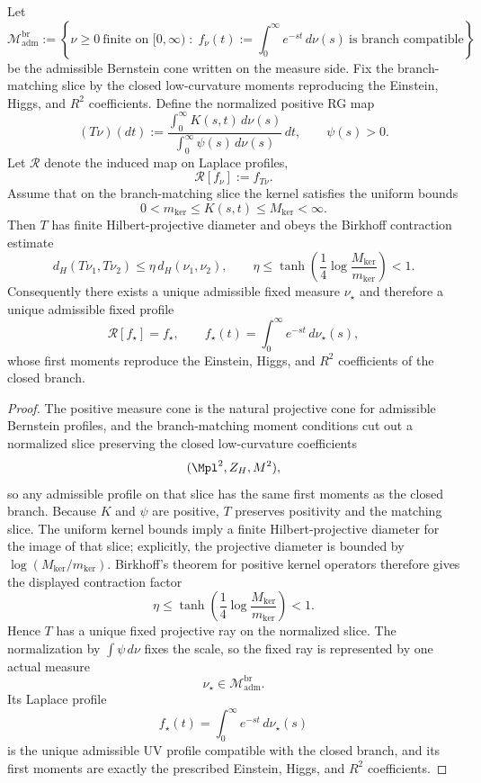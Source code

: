 \begin{theorem}
\label{thm:geometric-uv-fixed-point}
Let
\[
\mathcal M_{\mathrm{adm}}^{\mathrm{br}}
:=
\left\{
\nu\ge 0\ \text{finite on }[0,\infty)\;:\;
f_\nu(t):=\int_0^\infty e^{-st}\,d\nu(s)\ \text{is branch compatible}
\right\}
\]
be the admissible Bernstein cone written on the measure side. Fix the branch-matching slice by the
closed low-curvature moments reproducing the Einstein, Higgs, and $R^2$ coefficients. Define the
normalized positive RG map
\[
(T\nu)(dt)
:=
\frac{\int_0^\infty K(s,t)\,d\nu(s)}{\int_0^\infty \psi(s)\,d\nu(s)}\,dt,
\qquad
\psi(s)>0.
\]
Let $\mathcal R$ denote the induced map on Laplace profiles,
\[
\mathcal R[f_\nu]:=f_{T\nu}.
\]
Assume that on the branch-matching slice the kernel satisfies the uniform bounds
\[
0<m_{\mathrm{ker}}\le K(s,t)\le M_{\mathrm{ker}}<\infty.
\]
Then $T$ has finite Hilbert-projective diameter and obeys the Birkhoff contraction estimate
\[
d_H(T\nu_1,T\nu_2)
\le
\eta\,d_H(\nu_1,\nu_2),
\qquad
\eta\le
\tanh\!\left(\frac14\log\frac{M_{\mathrm{ker}}}{m_{\mathrm{ker}}}\right)<1.
\]
Consequently there exists a unique admissible fixed measure $\nu_\star$ and therefore a unique
admissible fixed profile
\[
\mathcal R[f_\star]=f_\star,
\qquad
f_\star(t)=\int_0^\infty e^{-st}\,d\nu_\star(s),
\]
whose first moments reproduce the Einstein, Higgs, and $R^2$ coefficients of the closed branch.
\end{theorem}

\begin{proof}
The positive measure cone is the natural projective cone for admissible Bernstein profiles, and the
branch-matching moment conditions cut out a normalized slice preserving the closed low-curvature
coefficients
\[
(\Mpl^2,Z_H,M^2),
\]
so any admissible profile on that slice has the same first moments as the closed branch. Because
$K$ and $\psi$ are positive, $T$ preserves positivity and the matching slice. The uniform kernel
bounds imply a finite Hilbert-projective diameter for the image of that slice; explicitly, the
projective diameter is bounded by $\log(M_{\mathrm{ker}}/m_{\mathrm{ker}})$. Birkhoff's theorem for
positive kernel operators therefore gives the displayed contraction factor
\[
\eta\le \tanh\!\left(\frac14\log\frac{M_{\mathrm{ker}}}{m_{\mathrm{ker}}}\right)<1.
\]
Hence $T$ has a unique fixed projective ray on the normalized slice. The normalization by
$\int\psi\,d\nu$ fixes the scale, so the fixed ray is represented by one actual measure
\[
\nu_\star\in\mathcal M_{\mathrm{adm}}^{\mathrm{br}}.
\]
Its Laplace profile
\[
f_\star(t)=\int_0^\infty e^{-st}\,d\nu_\star(s)
\]
is the unique admissible UV profile compatible with the closed branch, and its first moments are
exactly the prescribed Einstein, Higgs, and $R^2$ coefficients.
\end{proof}

